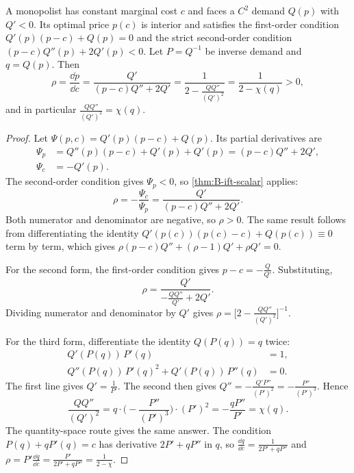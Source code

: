 \begin{proposition}\label{prop:B-passthrough-monopoly}
A monopolist has constant marginal cost $c$ and faces a $C^2$ demand $Q(p)$ with $Q' < 0$. Its optimal price $p(c)$ is
interior and satisfies the first-order condition $Q'(p)(p - c) + Q(p) = 0$ and the strict second-order condition
$(p - c)Q''(p) + 2Q'(p) < 0$. Let $P = Q^{-1}$ be inverse demand and $q = Q(p)$. Then
\begin{equation}\label{eq:B-pt-monopoly}
\rho = \frac{\dd p}{\dd c} = \frac{Q'}{(p - c)Q'' + 2Q'} = \frac{1}{2 - \frac{QQ''}{(Q')^2}} = \frac{1}{2 - \chi(q)} > 0 ,
\end{equation}
and in particular $\frac{QQ''}{(Q')^2} = \chi(q)$.
\end{proposition}

\begin{proof}
Let $\Psi(p, c) = Q'(p)(p - c) + Q(p)$. Its partial derivatives are
\begin{align*}
\Psi_p &= Q''(p)(p - c) + Q'(p) + Q'(p) = (p - c)Q'' + 2Q' , \\
\Psi_c &= -Q'(p) .
\end{align*}
The second-order condition gives $\Psi_p < 0$, so \cref{thm:B-ift-scalar} applies:
\begin{equation*}
\rho = -\frac{\Psi_c}{\Psi_p} = \frac{Q'}{(p - c)Q'' + 2Q'} .
\end{equation*}
Both numerator and denominator are negative, so $\rho > 0$. The same result follows from differentiating the identity
$Q'(p(c))(p(c) - c) + Q(p(c)) \equiv 0$ term by term, which gives $\rho(p - c)Q'' + (\rho - 1)Q' + \rho Q' = 0$.

For the second form, the first-order condition gives $p - c = -\frac{Q}{Q'}$. Substituting,
\begin{equation*}
\rho = \frac{Q'}{-\frac{QQ''}{Q'} + 2Q'} .
\end{equation*}
Dividing numerator and denominator by $Q'$ gives $\rho = \big[2 - \frac{QQ''}{(Q')^2}\big]^{-1}$.

For the third form, differentiate the identity $Q(P(q)) = q$ twice:
\begin{align*}
Q'(P(q))\,P'(q) &= 1 , \\
Q''(P(q))\,P'(q)^2 + Q'(P(q))\,P''(q) &= 0 .
\end{align*}
The first line gives $Q' = \frac{1}{P'}$. The second then gives $Q'' = -\frac{Q'P''}{(P')^2} = -\frac{P''}{(P')^3}$. Hence
\begin{equation*}
\frac{QQ''}{(Q')^2} = q\cdot\Big(-\frac{P''}{(P')^3}\Big)\cdot(P')^2 = -\frac{qP''}{P'} = \chi(q) .
\end{equation*}
The quantity-space route gives the same answer. The condition $P(q) + qP'(q) = c$ has derivative
$2P' + qP''$ in $q$, so $\frac{\dd q}{\dd c} = \frac{1}{2P' + qP''}$ and
$\rho = P'\frac{\dd q}{\dd c} = \frac{P'}{2P' + qP''} = \frac{1}{2 - \chi}$.
\end{proof}

